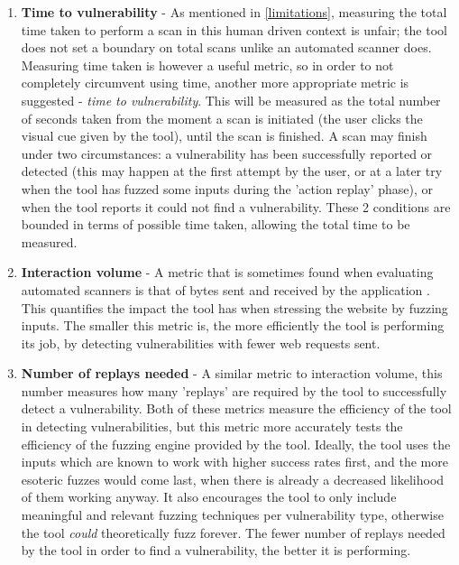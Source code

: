 \begin{enumerate}
	\item \textbf{Time to vulnerability} - As mentioned in \ref{limitations}, measuring the total time taken to perform a scan in this human driven context is unfair; the tool does not set a boundary on total scans unlike an automated scanner does. Measuring time taken is however a useful metric, so in order to not completely circumvent using time, another more appropriate metric is suggested - \emph{time to vulnerability}. This will be measured as the total number of seconds taken from the moment a scan is initiated (the user clicks the visual cue given by the tool), until the scan is finished. A scan may finish under two circumstances: a vulnerability has been successfully reported or detected (this may happen at the first attempt by the user, or at a later try when the tool has fuzzed some inputs during the 'action replay' phase), or when the tool reports it could not find a vulnerability. These 2 conditions are bounded in terms of possible time taken, allowing the total time to be measured.
	
	\item \textbf{Interaction volume} - A metric that is sometimes found when evaluating automated scanners  is that of bytes sent and received by the application \cite{stateOfArtAutomatedBlackBoxWebAppVulnTesting}. This quantifies the impact the tool has when stressing the website by fuzzing inputs. The smaller this metric is, the more efficiently the tool is performing its job, by detecting vulnerabilities with fewer web requests sent.
	
	\item \textbf{Number of replays needed} - A similar metric to interaction volume, this number measures how many 'replays' are required by the tool to successfully detect a vulnerability. Both of these metrics measure the efficiency of the tool in detecting vulnerabilities, but this metric more accurately tests the efficiency of the fuzzing engine provided by the tool. Ideally, the tool uses the inputs which are known to work with higher success rates first, and the more esoteric fuzzes would come last, when there is already a decreased likelihood of them working anyway. It also encourages the tool to only include meaningful and relevant fuzzing techniques per vulnerability type, otherwise the tool \emph{could} theoretically fuzz forever. The fewer number of replays needed by the tool in order to find a vulnerability, the better it is performing.
	
\end{enumerate}


